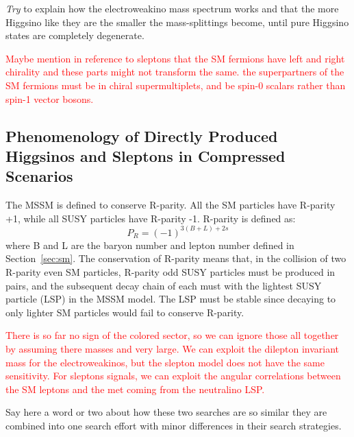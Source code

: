 
\cite{PhysRevD.96.055018}
\cite{Martin:1997ns}


\textit{Try} to explain how the electroweakino mass spectrum works and that the more Higgsino like they are the smaller the mass-splittings become, until pure Higgsino states are completely degenerate.

\textcolor{red}{Maybe mention in reference to sleptons that the SM fermions have left and right chirality and these parts might not transform the same.  the superpartners of the SM fermions must be in chiral supermultiplets, and be spin-0 scalars rather than spin-1 vector bosons.}

\subsection{Phenomenology of Directly Produced Higgsinos and Sleptons in Compressed Scenarios}
\label{sec:pheno}

The MSSM is defined to conserve R-parity.  All the SM particles have R-parity +1, while all SUSY particles have R-parity -1.  R-parity is defined as:
\begin{equation}
 P_R=(-1)^{3(B+L)+2s}
 \end{equation}
 where B and L are the baryon number and lepton number defined in Section~\ref{sec:sm}.  The conservation of R-parity means that, in the collision of two R-parity even SM particles, R-parity odd SUSY particles must be produced in pairs, and the subsequent decay chain of each must with the lightest SUSY particle (LSP) in the MSSM model.  The LSP must be stable since decaying to only lighter SM particles would fail to conserve R-parity. 
 
 
\textcolor{red}{ There is so far no sign of the colored sector, so we can ignore those all together by assuming there masses and very large.  We can exploit the dilepton invariant mass for the electroweakinos, but the slepton model does not have the same sensitivity.  For sleptons signals, we can exploit the angular correlations between the SM leptons and the met coming from the neutralino LSP.}

Say here a word or two about how these two searches are so similar they are combined into one search effort with minor differences in their search strategies.

